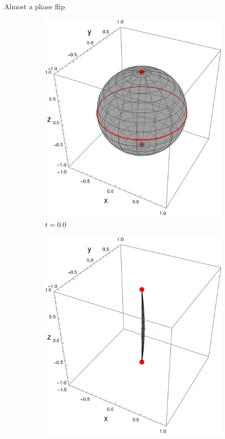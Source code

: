 \begin{frame}{Almost a phase flip}
    \begin{figure}[h!]
        \centering
        \begin{subfigure}{0.32\textwidth}
            \centering
            \includegraphics[width=0.9\linewidth]{figures/sphere_CNOT_t=0.0_z=0.8_p=0.95.png}
            \caption{$t=0.0$}
        \end{subfigure}%
        \begin{subfigure}{0.32\textwidth}
            \centering
            \includegraphics[width=0.9\linewidth]{figures/sphere_CNOT_t=1.0_z=0.8_p=0.95.png}

\end{subfigure}
\end{figure}
\end{frame}
